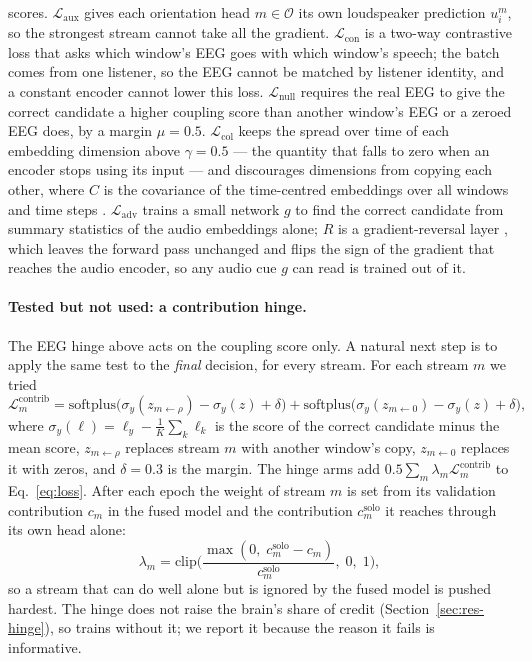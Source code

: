 scores.
$\mathcal{L}_{\text{aux}}$ gives each orientation head $m\in\mathcal{O}$ its own
loudspeaker prediction $u_i^m$, so the strongest stream cannot take all the
gradient. $\mathcal{L}_{\text{con}}$ is a two-way contrastive loss
\citep{oord2018,radford2021clip} that asks which window's EEG goes with which
window's speech; the batch comes from one listener, so the EEG cannot be matched
by listener identity, and a constant encoder cannot lower this loss.
$\mathcal{L}_{\text{null}}$ requires the real EEG to give the correct candidate a
higher coupling score than another window's EEG or a zeroed EEG does, by a margin
$\mu=0.5$. $\mathcal{L}_{\text{col}}$ keeps the spread over time of each embedding
dimension above $\gamma=0.5$ --- the quantity that falls to zero when an encoder
stops using its input --- and discourages dimensions from copying each other,
where $C$ is the covariance of the time-centred embeddings over all windows and
time steps \citep{bardes2022vicreg}. $\mathcal{L}_{\text{adv}}$ trains a small
network $g$ to find the correct candidate from summary statistics of the audio
embeddings alone; $R$ is a gradient-reversal layer \citep{ganin2015}, which
leaves the forward pass unchanged and flips the sign of the gradient that reaches
the audio encoder, so any audio cue $g$ can read is trained out of it.

\paragraph{Tested but not used: a contribution hinge.}
\label{sec:hinges}
The EEG hinge above acts on the coupling score only. A natural next step is to
apply the same test to the \emph{final} decision, for every stream. For each
stream $m$ we tried
\begin{equation}
  \mathcal{L}^{\text{contrib}}_m=
  \mathrm{softplus}\big(\sigma_y(z_{m\leftarrow\rho})-\sigma_y(z)+\delta\big)
  +\mathrm{softplus}\big(\sigma_y(z_{m\leftarrow 0})-\sigma_y(z)+\delta\big),
  \label{eq:hinge}
\end{equation}
where $\sigma_y(\ell)=\ell_y-\frac1K\sum_k\ell_k$ is the score of the correct
candidate minus the mean score, $z_{m\leftarrow\rho}$ replaces stream $m$ with
another window's copy, $z_{m\leftarrow 0}$ replaces it with zeros, and
$\delta\!=\!0.3$ is the margin. The hinge arms add $0.5\sum_m\lambda_m\mathcal{L}^{\text{contrib}}_m$
to Eq.~\ref{eq:loss}. After each epoch the weight of stream $m$ is set from its
validation contribution $c_m$ in the fused model and the contribution
$c_m^{\text{solo}}$ it reaches through its own head alone:
\begin{equation}
  \lambda_m=\mathrm{clip}\Big(\frac{\max(0,\;c_m^{\text{solo}}-c_m)}{c_m^{\text{solo}}},\;0,\;1\Big),
  \label{eq:gate}
\end{equation}
so a stream that can do well alone but is ignored by the fused model is pushed
hardest. The hinge does not raise the brain's share of credit
(Section~\ref{sec:res-hinge}), so \merit{} trains without it; we report it
because the reason it fails is informative.

